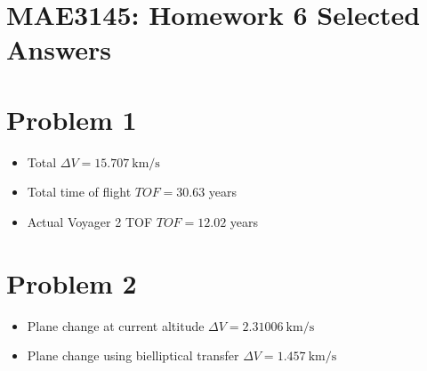 \documentclass[10pt]{article}
\date{}
\theoremstyle{definition}
\begin{document}
\setcounter{page}{1}
\pagestyle{plain}
\section*{MAE3145: Homework 6 Selected Answers}
\vspace*{-0.4cm}

\section*{Problem 1}
\begin{itemize}
    \item Total \( \Delta V  = \SI{15.707}{\kilo\meter\per\second}\)
    \item Total time of flight \( TOF = 30.63 \) years
    \item Actual Voyager 2 TOF \( TOF = 12.02 \) years
\end{itemize}

\section*{Problem 2}
\begin{itemize}
    \item Plane change at current altitude \( \Delta V = \SI{2.31006}{\kilo\meter\per\second}\)
    \item Plane change using bielliptical transfer \( \Delta V = \SI{1.457}{\kilo\meter\per\second}\)
\end{itemize}
\end{document}
